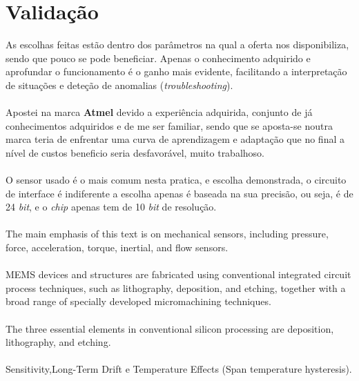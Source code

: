 \section{Validação}
As escolhas feitas estão dentro dos parâmetros na qual a oferta nos disponibiliza, sendo que pouco se pode beneficiar. Apenas o conhecimento adquirido e aprofundar o funcionamento é o ganho mais evidente, facilitando a interpretação de situações e deteção de anomalias (\textit{troubleshooting}).\\
\\
Apostei na marca \textbf{Atmel} devido a experiência adquirida, conjunto de já conhecimentos adquiridos e de me ser familiar, sendo que se aposta-se noutra marca teria de enfrentar uma curva de aprendizagem e adaptação que no final a nível de custos beneficio seria desfavorável, muito trabalhoso.\\
\\
O sensor usado é o mais comum nesta pratica, e escolha demonstrada, o circuito de interface é indiferente a escolha apenas é baseada na sua precisão, ou seja, é de 24 \textit{bit}, e o \textit{chip} apenas tem  de 10 \textit{bit} de resolução.
\\
\\





The main emphasis of this text is on mechanical sensors,
including pressure, force, acceleration, torque, inertial, and flow sensors. \cite{book-9}
\\
\\

MEMS devices and structures are fabricated using conventional integrated circuit
process techniques, such as lithography, deposition, and etching, together with a
broad range of specially developed micromachining techniques. \cite{book-9}
\\
\\
The three essential elements in conventional
silicon processing are deposition, lithography, and etching. \cite{book-9}
\\
\\
Sensitivity,Long-Term Drift e Temperature Effects (Span temperature hysteresis).

